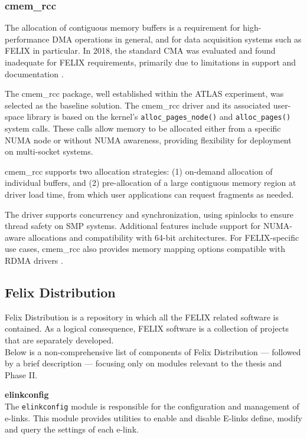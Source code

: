 \subsubsection{cmem\_rcc}

The allocation of contiguous memory buffers is a requirement for high-performance \acf{DMA} operations in general, and for data acquisition systems such as \acs{FELIX} in particular. In 2018, the standard \ac{CMA} was evaluated and found inadequate for \ac{FELIX} requirements, primarily due to limitations in support and documentation \cite{cmem-rcc}.

The cmem\_rcc \cite{cmem-rcc} package, well established within the \acs{ATLAS} experiment, was selected as the baseline solution. The cmem\_rcc driver and its associated user-space library is based on the kernel's \texttt{alloc\_pages\_node()} and \texttt{alloc\_pages()} system calls. These calls allow memory to be allocated either from a specific \ac{NUMA} node or without \ac{NUMA} awareness, providing flexibility for deployment on multi-socket systems.

cmem\_rcc supports two allocation strategies: (1) on-demand allocation of individual buffers, and (2) pre-allocation of a large contiguous memory region at driver load time, from which user applications can request fragments as needed.

The driver supports concurrency and synchronization, using spinlocks to ensure thread safety on \ac{SMP} systems. Additional features include support for \ac{NUMA}-aware allocations and compatibility with 64-bit architectures. For \ac{FELIX}-specific use cases, cmem\_rcc also provides memory mapping options compatible with \acs{RDMA} drivers \cite{cmem-rcc}.

\subsection{Felix Distribution}

Felix Distribution \cite{felix-distribution} is a repository in which all the \acs{FELIX} related software is contained.  As a logical consequence, \acs{FELIX} software is a collection of projects that are separately developed.\\
Below is a non-comprehensive list of components of Felix Distribution --- followed by a brief description --- focusing only on modules relevant to the thesis and Phase II.

\textbf{elinkconfig}\\
The \texttt{elinkconfig} module is responsible for the configuration and management of e-links. This module provides utilities to enable and disable \acs{E-link}s define, modify and query the settings of each e-link.

